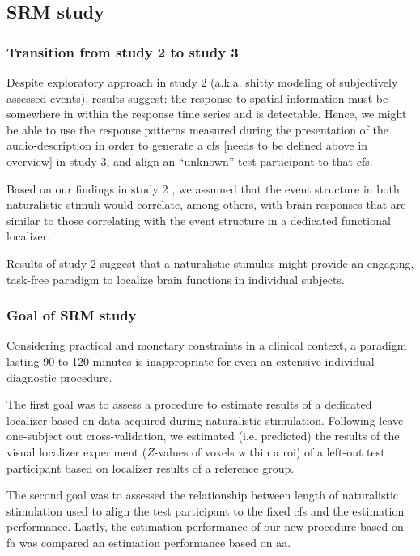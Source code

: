 \subsection{SRM study}


\subsubsection{Transition from study 2 to study 3}
%
Despite exploratory approach in study 2 (a.k.a. shitty modeling of subjectively
assessed events), results suggest:
%
the response to spatial information must be somewhere in within the response
time series and is detectable.
%
Hence, we might be able to use the response patterns measured during the
presentation of the audio-description in order to generate a \ac{cfs} [needs to
be defined above in overview] in study 3, and align an ``unknown'' test
participant to that \ac{cfs}.

Based on our findings in study 2 \citep{haeusler2022processing}, we assumed that
the event structure in both naturalistic stimuli would correlate, among others,
with brain responses that are similar to those correlating with the event
structure in a dedicated functional localizer.

Results of study 2 suggest that a naturalistic stimulus might provide an
engaging, task-free paradigm to localize brain functions in individual subjects.


\subsubsection{Goal of SRM study}
Considering practical and monetary constraints in a clinical context, a paradigm
lasting 90 to 120 minutes is inappropriate for even an extensive individual
diagnostic procedure.

The first goal was to assess a procedure to estimate results of a dedicated
localizer \citep{sengupta2016extension} based on data acquired during
naturalistic stimulation.
%
Following leave-one-subject out cross-validation, we estimated (i.e. predicted)
the results of the visual localizer experiment ($Z$-values of voxels within a
\ac{roi}) of a left-out test participant based on localizer results of a
reference group.

The second goal was to assessed the relationship between length of
naturalistic stimulation used to align the test participant to the fixed
\ac{cfs} and the estimation performance.
%
Lastly, the estimation performance of our new procedure based on \ac{fa} was
compared an estimation performance based on \ac{aa}.


